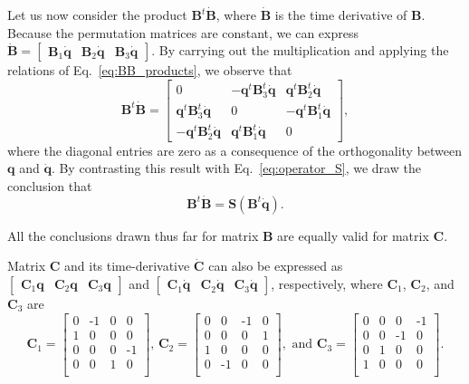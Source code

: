 \documentclass[aip,jcp,reprint,amsmath,amssymb,raggedbottom]{revtex4-1}
\newcommand{\mt}[1]{\boldsymbol{\mathbf{#1}}}           %
\newcommand{\vt}[1]{\boldsymbol{\mathbf{#1}}}           %
\newcommand{\tr}[1]{#1^t}                               %
\begin{document}
Let us now consider the product $\tr{\mt B}\dot{\mt B}$, where $\dot{\mt B}$ is the time derivative of $\mt B$. Because the permutation matrices are constant, we can express $\dot{\mt B} = [\begin{array}{ccc}{\mt B}_1\dot{\vt q} & {\mt B}_2\dot{\vt q} & {\mt B}_3\dot{\vt q}\end{array}]$. By carrying out the multiplication and applying the relations of Eq.~\ref{eq:BB_products}, we observe that
\[
\tr{\mt B}\dot{\mt B} = \left[
\begin{array}{ccc}
0 & -\tr{\vt q} \tr{\mt B_3}\dot{\vt q} & \tr{\vt q} \tr{\mt B_2}\dot{\vt q} \\
\tr{\vt q} \tr{\mt B_3}\dot{\vt q} & 0 & -\tr{\vt q} \tr{\mt B_1}\dot{\vt q} \\
-\tr{\vt q} \tr{\mt B_2}\dot{\vt q} & \tr{\vt q} \tr{\mt B_1}\dot{\vt q}  & 0
\end{array}
\right],
\]
where the diagonal entries are zero as a consequence of the orthogonality between $\vt q$ and $\dot{\vt q}$. By contrasting this result with Eq.~\ref{eq:operator_S}, we draw the conclusion that
\begin{equation}
\label{eq:relation_B_qdot}
\tr{\mt B}\dot{\mt B} = {\mt S}\left( \tr{\mt B}\dot{\vt q} \right).
\end{equation}

All the conclusions drawn thus far for matrix $\mt B$ are equally valid for matrix $\mt C$.

Matrix $\mt C$ and its time-derivative $\dot{\mt C}$ can also be expressed as $[\begin{array}{ccc}{\mt C}_1{\vt q} & {\mt C}_2{\vt q} & {\mt C}_3{\vt q}\end{array}]$ and $[\begin{array}{ccc}{\mt C}_1\dot{\vt q} & {\mt C}_2\dot{\vt q} & {\mt C}_3\dot{\vt q}\end{array}]$, respectively, where $\mt C_1$, $\mt C_2$, and $\mt C_3$ are
\[
{\mt C}_1 = \left[ \begin{smallmatrix}
 0 & \text{-}1 &  0 &  0 \\
 1 &  0 &  0 &  0 \\
 0 &  0 &  0 & \text{-}1 \\
 0 &  0 &  1 &  0 \\
\end{smallmatrix} \right], \,
{\mt C}_2 = \left[ \begin{smallmatrix}
 0 &  0 & \text{-}1 &  0 \\
 0 &  0 &  0 &  1 \\
 1 &  0 &  0 &  0 \\
 0 & \text{-}1 &  0 &  0 \\
\end{smallmatrix} \right], \text{ and }
{\mt C}_3 = \left[ \begin{smallmatrix}
 0 &  0 &  0 & \text{-}1 \\
 0 &  0 & \text{-}1 &  0 \\
 0 &  1 &  0 &  0 \\
 1 &  0 &  0 &  0 \\
\end{smallmatrix} \right].
\]
\end{document}

